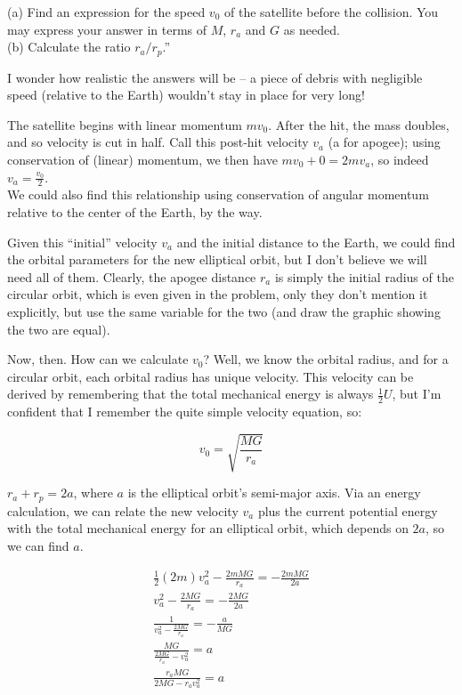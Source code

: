 \documentclass[8.01x]{subfiles}
\begin{document}
(a) Find an expression for the speed $v_0$ of the satellite before the collision. You may express your answer in terms of $M$, $r_a$ and $G$ as needed.\\
(b) Calculate the ratio $r_a/r_p$.''

I wonder how realistic the answers will be -- a piece of debris with negligible speed (relative to the Earth) wouldn't stay in place for very long!

The satellite begins with linear momentum $m v_0$. After the hit, the mass doubles, and so velocity is cut in half. Call this post-hit velocity $v_a$ (a for apogee); using conservation of (linear) momentum, we then have $m v_0 + 0 = 2m v_a$, so indeed $\displaystyle v_a = \frac{v_0}{2}$.\\
We could also find this relationship using conservation of angular momentum relative to the center of the Earth, by the way.

Given this ``initial'' velocity $v_a$ and the initial distance to the Earth, we could find the orbital parameters for the new elliptical orbit, but I don't believe we will need all of them. Clearly, the apogee distance $r_a$ is simply the initial radius of the circular orbit, which is even given in the problem, only they don't mention it explicitly, but use the same variable for the two (and draw the graphic showing the two are equal).

Now, then. How can we calculate $v_0$? Well, we know the orbital radius, and for a circular orbit, each orbital radius has  unique velocity. This velocity can be derived by remembering that the total mechanical energy is always $\frac{1}{2} U$, but I'm confident that I remember the quite simple velocity equation, so:

\begin{equation}
v_0 = \sqrt{\frac{M G}{r_a}}
\end{equation}

$r_a + r_p = 2 a$, where $a$ is the elliptical orbit's semi-major axis. Via an energy calculation, we can relate the new velocity $v_a$ plus the current potential energy with the total mechanical energy for an elliptical orbit, which depends on $2a$, so we can find $a$.

\begin{align}
\frac{1}{2} (2m) v_a^2 - \frac{2m M G}{r_a} = - \frac{2m M G}{2a}\\
v_a^2 - \frac{2 M G}{r_a} = - \frac{2 M G}{2a}\\
\frac{1}{v_a^2 - \frac{2 M G}{r_a}} = - \frac{a}{M G}\\
\frac{M G}{\frac{2 M G}{r_a} - v_a^2} = a\\
\frac{r_a M G}{2 M G - r_a v_a^2} = a
\end{align}
\end{document}
